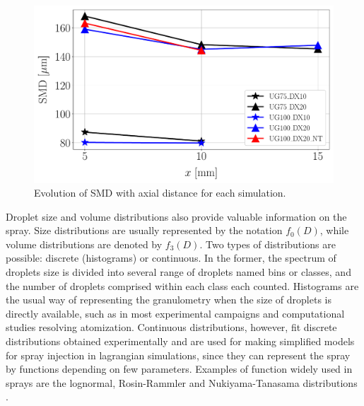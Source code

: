 \begin{figure}[ht]
\centering
   \includegraphics[scale=0.30]{./part2_developments/figures_ch5_resolved_JICF/SPRAY_characterization/SMD_values}
   \vspace*{-0.2in}
   \caption{Evolution of SMD with axial distance for each simulation.}
   \label{fig:ch5_spray_char_SMD_final}
\end{figure}



Droplet size and volume distributions also provide valuable information on the spray. Size distributions are usually represented by the notation $f_0 \left( D \right)$, while volume distributions are denoted by $f_3 \left( D \right)$. Two types of distributions are possible: discrete (histograms) or continuous. In the former, the spectrum of droplets size is divided into several range of droplets named bins or classes, and the number of droplets comprised within each class each counted. Histograms are the usual way of representing the granulometry when the size of droplets is directly available, such as in most experimental campaigns and computational studies resolving atomization. Continuous distributions, however, fit discrete distributions obtained experimentally and are used for making simplified models for spray injection in lagrangian simulations, since they can represent the spray by functions depending on few parameters. Examples of function widely used in sprays are the lognormal, Rosin-Rammler and Nukiyama-Tanasama distributions . 

